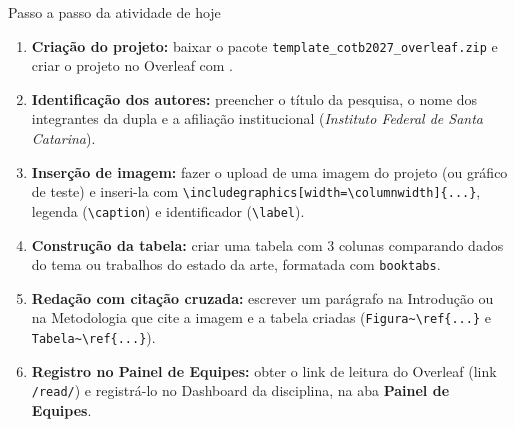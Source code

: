     \begin{painel}{\faTasks}{Passo a passo da atividade de hoje}
        \begin{enumerate}[label={\protect\circulo{\arabic*}}, leftmargin=2.4em]
            \item \textbf{Criação do projeto:} baixar o pacote \texttt{template\_cotb2027\_overleaf.zip} e criar o projeto no Overleaf com \seta{}.
            \item \textbf{Identificação dos autores:} preencher o título da pesquisa, o nome dos integrantes da dupla e a afiliação institucional (\textit{Instituto Federal de Santa Catarina}).
            \item \textbf{Inserção de imagem:} fazer o upload de uma imagem do projeto (ou gráfico de teste) e inseri-la com \texttt{\textbackslash includegraphics[width=\textbackslash columnwidth]\{...\}}, legenda (\texttt{\textbackslash caption}) e identificador (\texttt{\textbackslash label}).
            \item \textbf{Construção da tabela:} criar uma tabela com 3 colunas comparando dados do tema ou trabalhos do estado da arte, formatada com \texttt{booktabs}.
            \item \textbf{Redação com citação cruzada:} escrever um parágrafo na Introdução ou na Metodologia que cite a imagem e a tabela criadas (\texttt{Figura\textasciitilde\textbackslash ref\{...\}} e \texttt{Tabela\textasciitilde\textbackslash ref\{...\}}).
            \item \textbf{Registro no Painel de Equipes:} obter o link de leitura do Overleaf (\seta link \texttt{/read/}) e registrá-lo no Dashboard da disciplina, na aba \textbf{Painel de Equipes}.
        \end{enumerate}
    \end{painel}

    \vspace{0.6em}


